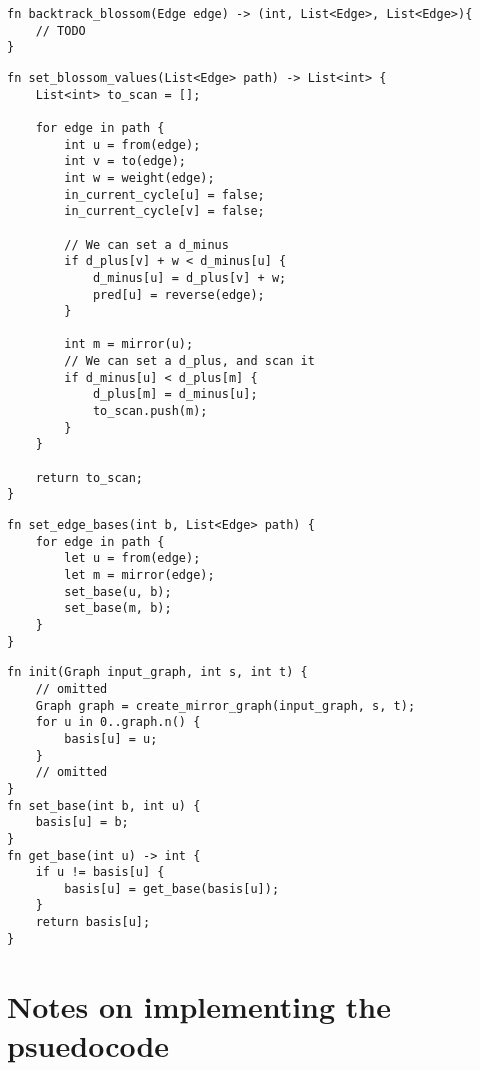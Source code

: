 \begin{lstlisting}[caption={Backtrack blossom},label=Listing,mathescape=true]
fn backtrack_blossom(Edge edge) -> (int, List<Edge>, List<Edge>){
    // TODO
}
\end{lstlisting}


\begin{lstlisting}[caption={Set blossom values},label=Listing,mathescape=true]
fn set_blossom_values(List<Edge> path) -> List<int> {
    List<int> to_scan = [];

    for edge in path {
        int u = from(edge);
        int v = to(edge);
        int w = weight(edge);
        in_current_cycle[u] = false;
        in_current_cycle[v] = false;

        // We can set a d_minus
        if d_plus[v] + w < d_minus[u] {
            d_minus[u] = d_plus[v] + w;
            pred[u] = reverse(edge);
        }

        int m = mirror(u);
        // We can set a d_plus, and scan it
        if d_minus[u] < d_plus[m] {
            d_plus[m] = d_minus[u];
            to_scan.push(m);
        }
    }

    return to_scan;
}
\end{lstlisting}

\begin{lstlisting}[caption={Set edge bases},label=Listing,mathescape=true]
fn set_edge_bases(int b, List<Edge> path) {
    for edge in path {
        let u = from(edge);
        let m = mirror(edge);
        set_base(u, b);
        set_base(m, b);
    }
}
\end{lstlisting}


\begin{lstlisting}[caption={Basis},label=Listing,mathescape=true]
fn init(Graph input_graph, int s, int t) {
    // omitted
    Graph graph = create_mirror_graph(input_graph, s, t);
    for u in 0..graph.n() {
        basis[u] = u;
    }
    // omitted
}
fn set_base(int b, int u) {
    basis[u] = b;
}
fn get_base(int u) -> int {
    if u != basis[u] {
        basis[u] = get_base(basis[u]);
    }
    return basis[u];
}

\end{lstlisting}

\section{Notes on implementing the psuedocode}